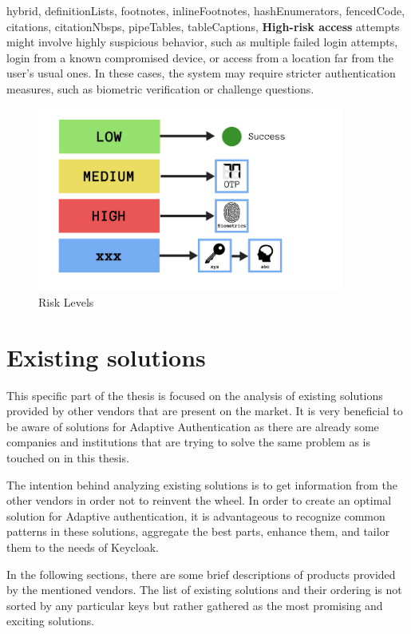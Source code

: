 \documentclass[
  digital,     %
  oneside,     %
  nosansbold,  %
  nocolorbold, %
  lof,         %
  lot,         %
]{fithesis4}
\begin{document}
\begin{markdown*}{%
  hybrid,
  definitionLists,
  footnotes,
  inlineFootnotes,
  hashEnumerators,
  fencedCode,
  citations,
  citationNbsps,
  pipeTables,
  tableCaptions,
}
\textbf{High-risk access} attempts might involve highly suspicious behavior, such as multiple failed login attempts, login from a known compromised device, or access from a location far from the user's usual ones.
In these cases, the system may require stricter authentication measures, such as biometric verification or challenge questions.

\begin{figure}[htbp]
  \centering
  \includegraphics[width=0.9\textwidth]{img/risk.png}
  \caption{Risk Levels}
  \label{fig:risk-level}
\end{figure}

\shorthandon{-}

\chapter{Existing solutions}

This specific part of the thesis is focused on the analysis of existing solutions provided by other vendors that are present on the market.
It is very beneficial to be aware of solutions for Adaptive Authentication as there are already some companies and institutions that are trying to solve the same problem as is touched on in this thesis.

The intention behind analyzing existing solutions is to get information from the other vendors in order not to reinvent the wheel.
In order to create an optimal solution for Adaptive authentication, it is advantageous to recognize common patterns in these solutions, aggregate the best parts, enhance them, and tailor them to the needs of Keycloak. 

In the following sections, there are some brief descriptions of products provided by the mentioned vendors.
The list of existing solutions and their ordering is not sorted by any particular keys but rather gathered as the most promising and exciting solutions.


\end{markdown*}
\end{document}
